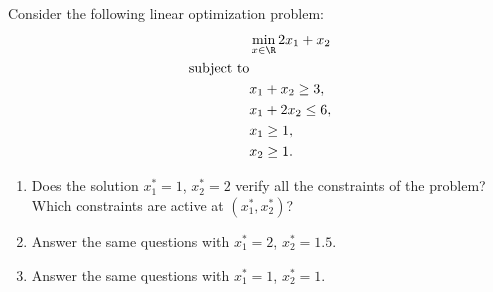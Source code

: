 
 Consider the following linear optimization problem:
\begin{align*}
 & \min_{x \in \R} 2 x_1 + x_2 \\
 \text{subject to} & \\
 & x_1 + x_2 \geq 3, \\
 & x_1 + 2 x_2 \leq 6, \\
 & x_1 \geq 1, \\
 & x_2 \geq 1.
\end{align*}

\begin{enumerate}
    \item Does the solution $x_1^* = 1$, $x_2^* = 2$ verify all the constraints of the problem? Which constraints are active at $(x_1^*, x_2^*)$?
    \item Answer the same questions with $x_1^* = 2$, $x_2^* = 1.5$.
    \item Answer the same questions with $x_1^* = 1$, $x_2^* = 1$.
\end{enumerate}



